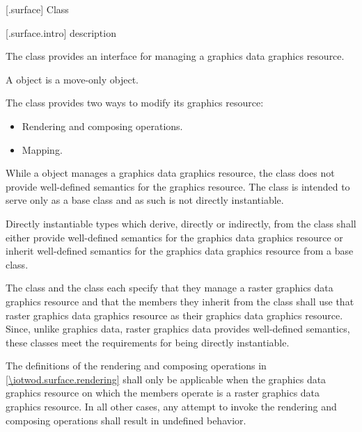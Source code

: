  [\iotwod.surface] {Class }

 [\iotwod.surface.intro] { description}

\pnum
{}
The  class provides an interface for managing a graphics
data graphics resource.

\pnum
A  object is a move-only object.

\pnum
The  class provides two ways to modify its graphics resource:
\begin{itemize}
	\item Rendering and composing operations.
	\item Mapping.
\end{itemize}

\pnum
\begin{note}
While a  object manages a graphics data graphics resource, the  class does not provide well-defined semantics for the graphics resource. The  class is intended to serve only as a base class and as such is not directly instantiable.
\end{note}

\pnum
Directly instantiable types which derive, directly or indirectly, from the  class shall either provide well-defined semantics for the graphics data graphics resource or inherit well-defined semantics for the graphics data graphics resource from a base class.

\pnum
\begin{example}
The  class and the  class each specify that they manage a raster graphics data graphics resource and that the members they inherit from the  class shall use that raster graphics data graphics resource as their graphics data graphics resource. Since, unlike graphics data, raster graphics data provides well-defined semantics, these classes meet the requirements for being directly instantiable.
\end{example}

\pnum
The definitions of the rendering and composing operations in \ref{\iotwod.surface.rendering} shall only be applicable when the graphics data graphics resource on which the  members operate is a raster graphics data graphics resource. In all other cases, any attempt to invoke the rendering and composing operations shall result in undefined behavior.

